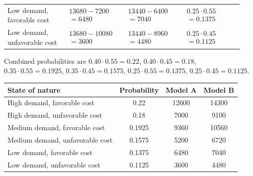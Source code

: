 \begin{ExamProblems}
\begin{center}
\begin{tabular}{p{0.24\linewidth} p{0.24\linewidth} p{0.24\linewidth} p{0.24\linewidth}}
			\parbox[t]{\linewidth}{Low demand,\\ favorable cost} &
			$\begin{array}{l}
				13680 - 7200\\
				= 6480
			\end{array}$ &
			$\begin{array}{l}
				13440 - 6400\\
				= 7040
			\end{array}$ &
			$\begin{array}{l}
				0.25\cdot 0.55\\
				= 0.1375
			\end{array}$ \\
			
			\parbox[t]{\linewidth}{Low demand,\\ unfavorable cost} &
			$\begin{array}{l}
				13680 - 10080\\
				= 3600
			\end{array}$ &
			$\begin{array}{l}
				13440 - 8960\\
				= 4480
			\end{array}$ &
			$\begin{array}{l}
				0.25\cdot 0.45\\
				= 0.1125
			\end{array}$ \\
			\bottomrule
		\end{tabular}
	\end{center}
	Combined probabilities are $0.40\cdot 0.55=0.22$, $0.40\cdot 0.45=0.18$, $0.35\cdot 0.55=0.1925$, $0.35\cdot 0.45=0.1575$, $0.25\cdot 0.55=0.1375$, $0.25\cdot 0.45=0.1125$.
	\begin{center}
		\begin{tabular}{l c c c}
			\toprule
			State of nature & Probability & Model A & Model B \\
			\midrule
			High demand, favorable cost & 0.22 & 12600 & 14300 \\
			High demand, unfavorable cost & 0.18 & 7000 & 9100 \\
			Medium demand, favorable cost & 0.1925 & 9360 & 10560 \\
			Medium demand, unfavorable cost & 0.1575 & 5200 & 6720 \\
			Low demand, favorable cost & 0.1375 & 6480 & 7040 \\
			Low demand, unfavorable cost & 0.1125 & 3600 & 4480 \\
			\bottomrule
	\end{tabular}
	\end{center}


\end{ExamProblems}
